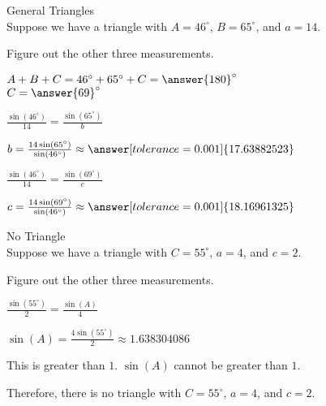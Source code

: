 \documentclass{ximera}
\begin{document}
\begin{example}  General Triangles \\

Suppose we have a triangle with $A=46^{\circ}$, $B=65^{\circ}$, and $a=14$.

Figure out the other three measurements.


\begin{explanation}

$A + B + C = 46^{\circ} + 65^{\circ} + C = \answer{180}^{\circ}$ \\

$C = \answer{69}^{\circ}$


$\frac{\sin(46^{\circ})}{14} = \frac{\sin(65^{\circ})}{b}$

$b = \frac{14 \sin(65^{\circ})}{\sin(46^{\circ})} \approx \answer[tolerance=0.001]{17.63882523}$

$\frac{\sin(46^{\circ})}{14} = \frac{\sin(69^{\circ})}{c}$

$c = \frac{14 \sin(69^{\circ})}{\sin(46^{\circ})} \approx \answer[tolerance=0.001]{18.16961325}$

\end{explanation}


\end{example}












\begin{example}  No Triangle \\

Suppose we have a triangle with $C=55^{\circ}$, $a=4$, and $c=2$.

Figure out the other three measurements.


\begin{explanation}


$\frac{\sin(55^{\circ})}{2} = \frac{\sin(A)}{4}$

$\sin(A) = \frac{4 \sin(55^{\circ})}{2} \approx 1.638304086$

This is greater than $1$. $\sin(A)$ cannot be greater than $1$.

Therefore, there is no triangle with $C=55^{\circ}$, $a=4$, and $c=2$. 

\end{explanation}


\end{example}
\end{document}
